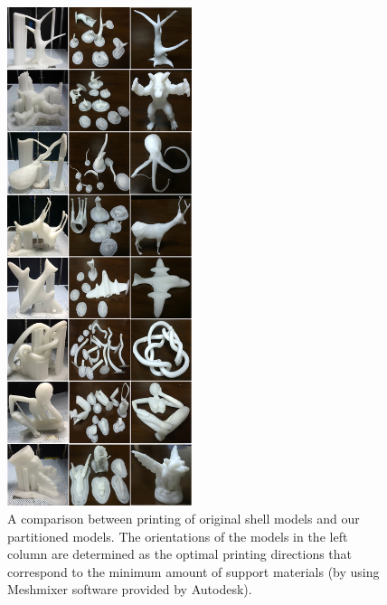 \begin{figure}[ht]
  \centering
  \includegraphics[width=0.48\textwidth]{figs/experiment.png}
  \caption{\label{fig:experiment}%
           A comparison between printing of original shell models and our partitioned models. The orientations of the models in the left column are determined as the optimal printing directions that correspond to the minimum amount of support materials (by using Meshmixer software provided by Autodesk). }
\end{figure}

